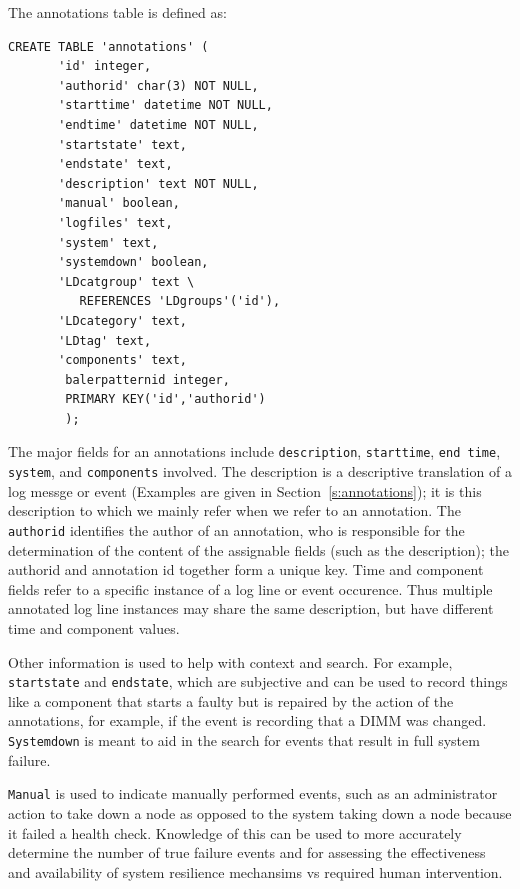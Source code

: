 The annotations table is defined as:
\begin{small}
\begin{verbatim}
CREATE TABLE 'annotations' (
       'id' integer,
       'authorid' char(3) NOT NULL,
       'starttime' datetime NOT NULL,
       'endtime' datetime NOT NULL,
       'startstate' text,
       'endstate' text,
       'description' text NOT NULL,
       'manual' boolean,
       'logfiles' text,
       'system' text,
       'systemdown' boolean,
       'LDcatgroup' text \
          REFERENCES 'LDgroups'('id'),
       'LDcategory' text,
       'LDtag' text,
       'components' text,
        balerpatternid integer,
        PRIMARY KEY('id','authorid')
        );
\end{verbatim}
\end{small}

The major fields for an annotations include \texttt{description}, \texttt{starttime}, \texttt{end time},
\texttt{system}, and \texttt{components} involved.
The description is a descriptive translation of a log messge or event (Examples
are given in Section~\ref{s:annotations}); it is this description to which we
mainly refer when we refer to an annotation.
The \texttt{authorid} identifies the author of an annotation, who
is responsible for the determination of the content of the assignable fields
(such as the description); the authorid and annotation id together form a unique key.
Time and component fields refer to a specific instance of a log line or event
occurence. Thus multiple annotated log line instances may share the same description,
but have different time and component values.

Other information is used to help with context and search.
For example, \texttt{startstate} and \texttt{endstate}, which
are subjective and can be used to record things like a component
that starts a faulty but is repaired by the action of the annotations,
for example, if the event is recording that a DIMM was changed.
\texttt{Systemdown} is meant to aid in the search for events that result
in full system failure.

\texttt{Manual} is used to indicate manually performed
events, such as an administrator action to take down a node as opposed
to the system taking down a node because it failed a health check.
Knowledge of this can be used to more accurately determine the
number of true failure events and for assessing the effectiveness
and availability of system resilience mechansims vs required
human intervention.

